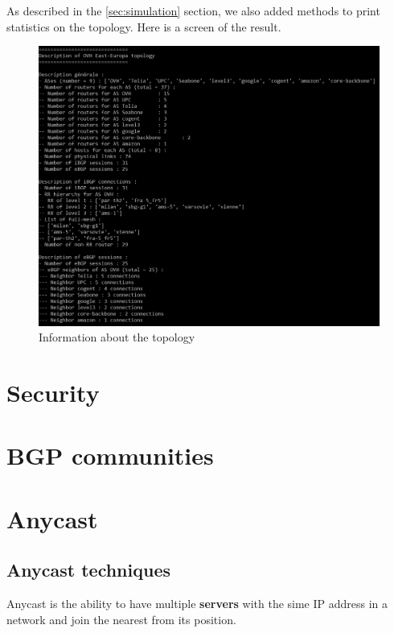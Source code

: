\documentclass[letter, 9pt, conference]{ieeeconf}
\begin{document}
As described in the \ref{sec:simulation} section, we also added methods to print statistics on the topology. Here is a screen of the result. 

\begin{figure}[h!]
    \includegraphics[width=\linewidth]{topo_summary.PNG}
    \caption{Information about the topology}
    \label{fig:topo_summary}
\end{figure}


\section{Security}
\label{sec:security}


\section{BGP communities}
\label{sec:communities}


\section{Anycast}
\label{sec:anycast}

\subsection{Anycast techniques}

Anycast is the ability to have multiple \textbf{servers} with the sime IP address in a network and join the nearest from its position. 
\end{document}
